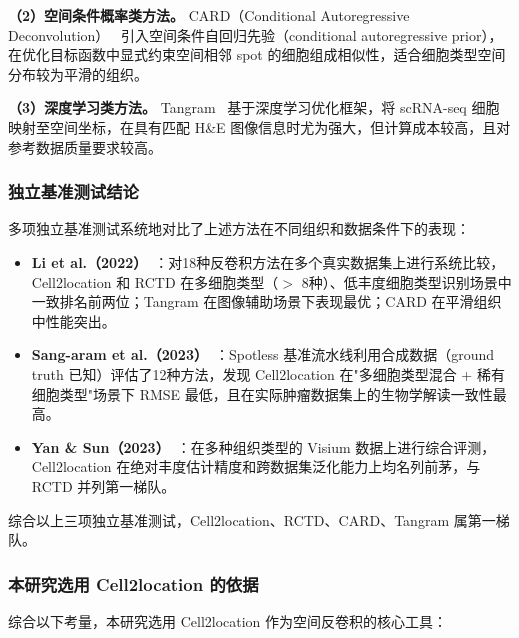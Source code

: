 \documentclass[12pt, a4paper]{ctexart}
\begin{document}
\textbf{（2）空间条件概率类方法。}
CARD（Conditional Autoregressive Deconvolution）~\cite{ma2022integrative} 引入空间条件自回归先验（conditional autoregressive prior），在优化目标函数中显式约束空间相邻 spot 的细胞组成相似性，适合细胞类型空间分布较为平滑的组织。

\textbf{（3）深度学习类方法。}
Tangram~\cite{biancalani2021deep} 基于深度学习优化框架，将 scRNA-seq 细胞映射至空间坐标，在具有匹配 H\&E 图像信息时尤为强大，但计算成本较高，且对参考数据质量要求较高。

\subsubsection{独立基准测试结论}

多项独立基准测试系统地对比了上述方法在不同组织和数据条件下的表现：

\begin{itemize}
    \item \textbf{Li et al.（2022）}~\cite{li2022benchmarking}：对18种反卷积方法在多个真实数据集上进行系统比较，Cell2location 和 RCTD 在多细胞类型（$>$ 8种）、低丰度细胞类型识别场景中一致排名前两位；Tangram 在图像辅助场景下表现最优；CARD 在平滑组织中性能突出。
    \item \textbf{Sang-aram et al.（2023）}~\cite{sang2023spotless}：Spotless 基准流水线利用合成数据（ground truth 已知）评估了12种方法，发现 Cell2location 在"多细胞类型混合 + 稀有细胞类型"场景下 RMSE 最低，且在实际肿瘤数据集上的生物学解读一致性最高。
    \item \textbf{Yan \& Sun（2023）}~\cite{yan2023benchmarking}：在多种组织类型的 Visium 数据上进行综合评测，Cell2location 在绝对丰度估计精度和跨数据集泛化能力上均名列前茅，与 RCTD 并列第一梯队。
\end{itemize}

综合以上三项独立基准测试，Cell2location、RCTD、CARD、Tangram 属第一梯队。

\subsubsection{本研究选用 Cell2location 的依据}

综合以下考量，本研究选用 Cell2location 作为空间反卷积的核心工具：
\end{document}
